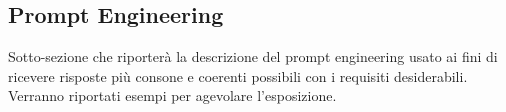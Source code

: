 \subsection{Prompt Engineering}

Sotto-sezione che riporterà la descrizione del prompt engineering usato ai fini di ricevere risposte più consone e coerenti possibili con i requisiti desiderabili.
Verranno riportati esempi per agevolare l'esposizione.
